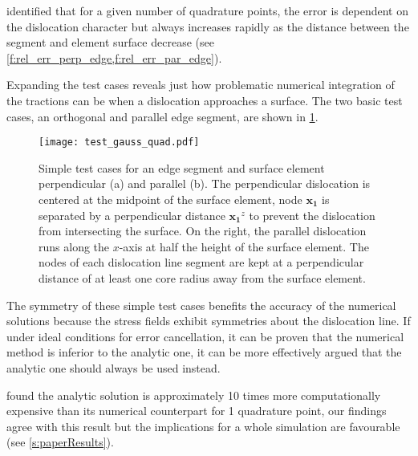 \citet{analytic_tractions} identified that for a given number of quadrature points, the error is dependent on the dislocation character but always increases rapidly as the distance between the segment and element surface decrease (see \cref{f:rel_err_perp_edge,f:rel_err_par_edge}).

Expanding the test cases reveals just how problematic numerical integration of the tractions can be when a dislocation approaches a surface. The two basic test cases, an orthogonal and parallel edge segment, are shown in \cref{f:gauss_quad_test}.
\begin{figure}
    \centering
    \texttt{[image: test\_gauss\_quad.pdf]}
    \caption[Test cases for comparing numeric vs analytic tractions using an edge dislocation near a surface.]{Simple test cases for an edge segment and surface element perpendicular (a) and parallel (b). The perpendicular dislocation is centered at the midpoint of the surface element, node $\mathbf{x_1}$ is separated by a perpendicular distance $\mathbf{x_1}^z$ to prevent the dislocation from intersecting the surface. On the right, the parallel dislocation runs along the $x$-axis at half the height of the surface element. The nodes of each dislocation line segment are kept at a perpendicular distance of at least one core radius away from the surface element.}
    \label{f:gauss_quad_test}
\end{figure}

The symmetry of these simple test cases benefits the accuracy of the numerical solutions because the stress fields exhibit symmetries about the dislocation line. If under ideal conditions for error cancellation, it can be proven that the numerical method is inferior to the analytic one, it can be more effectively argued that the analytic one should always be used instead.

\citet{analytic_tractions} found the analytic solution is approximately 10 times more computationally expensive than its numerical counterpart for 1 quadrature point, our findings agree with this result but the implications for a whole simulation are favourable (see \cref{s:paperResults}).

